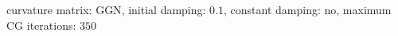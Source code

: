 curvature matrix: $\text{GGN}$, initial damping: $\num[scientific-notation=true]{0.1}$, constant damping: $\text{no}$, maximum CG iterations: $\num[scientific-notation=false]{350}$